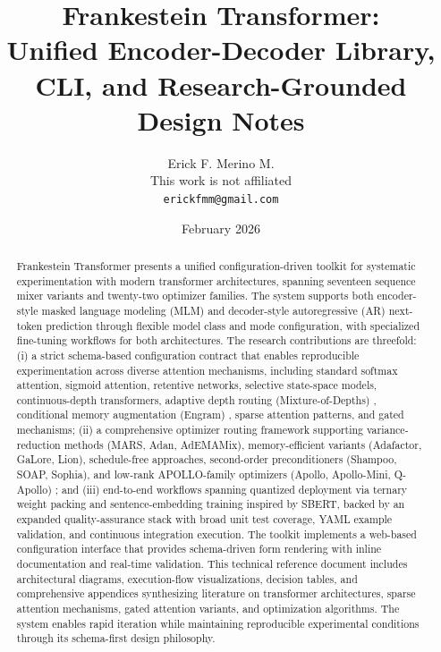 \documentclass[11pt,a4paper]{article}
\title{Frankestein Transformer:\\Unified Encoder-Decoder Library, CLI, and Research-Grounded Design Notes}
\author{
Erick F. Merino M. \\
This work is not affiliated \\
\texttt{erickfmm@gmail.com}
}
\date{February 2026}
\begin{document}
\maketitle

\begin{abstract}
Frankestein Transformer presents a unified configuration-driven toolkit for systematic experimentation with modern transformer architectures, spanning seventeen sequence mixer variants and twenty-two optimizer families. The system supports both encoder-style masked language modeling (MLM) and decoder-style autoregressive (AR) next-token prediction through flexible model class and mode configuration, with specialized fine-tuning workflows for both architectures. The research contributions are threefold: (i) a strict schema-based configuration contract that enables reproducible experimentation across diverse attention mechanisms, including standard softmax attention, sigmoid attention, retentive networks, selective state-space models, continuous-depth transformers, adaptive depth routing (Mixture-of-Depths) \citep{zhu2026mixtureofdepthsattention}, conditional memory augmentation (Engram) \citep{cheng2026conditionalmemoryscalablelookup}, sparse attention patterns, and gated mechanisms; (ii) a comprehensive optimizer routing framework supporting variance-reduction methods (MARS, Adan, AdEMAMix), memory-efficient variants (Adafactor, GaLore, Lion), schedule-free approaches, second-order preconditioners (Shampoo, SOAP, Sophia), and low-rank APOLLO-family optimizers (Apollo, Apollo-Mini, Q-Apollo) \citep{zhu2025apollosgdlikememoryadamwlevel}; and (iii) end-to-end workflows spanning quantized deployment via ternary weight packing and sentence-embedding training inspired by SBERT, backed by an expanded quality-assurance stack with broad unit test coverage, YAML example validation, and continuous integration execution. The toolkit implements a web-based configuration interface that provides schema-driven form rendering with inline documentation and real-time validation. This technical reference document includes architectural diagrams, execution-flow visualizations, decision tables, and comprehensive appendices synthesizing literature on transformer architectures, sparse attention mechanisms, gated attention variants, and optimization algorithms. The system enables rapid iteration while maintaining reproducible experimental conditions through its schema-first design philosophy.
\end{abstract}

\tableofcontents
\newpage
\end{document}
